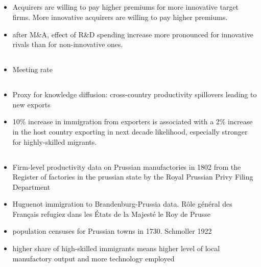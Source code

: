 \documentclass[10pt]{article} %
\begin{document}
    \subsection{\cite{KaufmannSchiereck2023}}
    \begin{itemize}
        \item Acquirers are willing to pay higher premiums for more innovative target firms. More innovative acquirers are willing to pay higher premiums.
        \item after M\&A, effect of R\&D spending increase more pronounced for innovative rivals than for non-innovative ones.
    \end{itemize}
    \subsection{\cite{AghionHarrisHowittVickers2001}}
    
    \subsection{\cite{Prato2022}}
    \begin{itemize}
        \item Meeting rate
    \end{itemize}

    \subsection{\cite{BaharRapoport2018}}
    \begin{itemize}
        \item Proxy for knowledge diffusion: cross-country productivity spillovers leading to new exports
        \item 10\% increase in immigration from exporters is associated with a 2\% increase in the host country exporting in next decade likelihood, especially stronger for highly-skilled migrants.
    \end{itemize}

    \subsection{\cite{Hornung2014}}
    \begin{itemize}
        \item Firm-level productivity data on Prussian manufactories in 1802 from the Register of factories in the prussian state by the Royal Prussian Privy Filing Department
        \item Huguenot immigration to Brandenburg-Prussia data. Rôle général des Français refugiez dans les États de la Majesté le Roy de Prusse
        \item population censuses for Prussian towns in 1730. Schmoller 1922
        \item higher share of high-skilled immigrants means higher level of local manufactory output and more technology employed
    \end{itemize}
\end{document}
